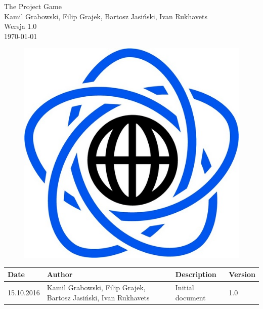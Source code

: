 \documentclass[11pt,a4paper]{article}
\begin{document}
\begin{titlepage}
\centering
\huge The Project Game \\
\vspace{1.5cm}
\large Kamil Grabowski, Filip Grajek, Bartosz Jasiński, Ivan Rukhavets \\
\vspace{1.0cm}
Wersja 1.0 \\
\vspace{1.0cm}
\today
\end{titlepage}

		
\begin{figure}
	\centering\includegraphics[scale=0.3]{images/logo.png}
\end{figure}	
\newpage
			
\begin{longtable}{| l | p{4.5cm} | p{4.5cm} | l | }
\hline
\textbf{Date} & \textbf{Author} & \textbf{Description} & Version \\ \hline
15.10.2016 & Kamil Grabowski, Filip Grajek, Bartosz Jasiński, Ivan Rukhavets & Initial document & 1.0 \\ \hline
\end{longtable}
\end{document}
